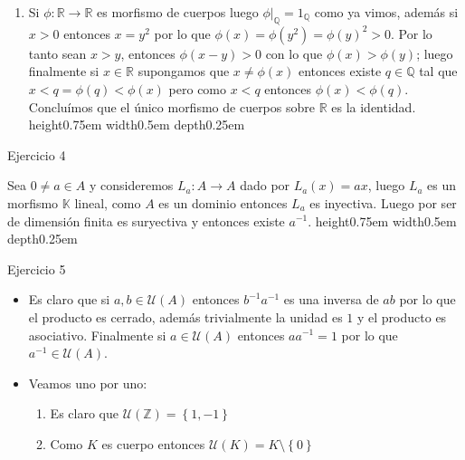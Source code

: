 \documentclass[11pt]{article}
\newcommand{\Q}{\mathbb{Q}}
\newcommand{\Z}{\mathbb{Z}}
\newcommand{\R}{{\mathbb{R}}}
\newcommand{\sett}[1]{\left\lbrace#1\right\rbrace}
\newenvironment{proof}[1][Demostraci\'on]{\begin{trivlist}
		\item[\hskip \labelsep {\bfseries #1}]}{\end{trivlist}}
\newcommand{\qed}{\nobreak \ifvmode \relax \else
	\ifdim\lastskip<1.5em \hskip-\lastskip
	\hskip1.5em plus0em minus0.5em \fi \nobreak
	\vrule height0.75em width0.5em depth0.25em\fi}
\begin{document}
\begin{enumerate}
\begin{proof}
\begin{enumerate}
			\item Si $\phi: \R \rightarrow \R$ es morfismo de cuerpos luego $\phi|_{\Q} = 1_{\Q}$ como ya vimos, adem\'as si $x > 0$ entonces $x = y^2$ por lo que $\phi(x) = \phi(y^2)=\phi(y)^2 > 0$. Por lo tanto sean $x > y$, entonces $\phi(x-y) > 0$ con lo que $\phi(x) > \phi(y)$; luego finalmente si $x \in \R$ supongamos que $x \neq \phi(x)$ entonces existe $q \in \Q$ tal que $x < q=\phi(q) < \phi(x)$ pero como $x < q$ entonces $\phi(x) < \phi(q)$. Conclu\'imos que el \'unico morfismo de cuerpos sobre $\R$ es la identidad. \qed
			
		\end{enumerate}
		
	\end{proof}
	
	\item Ejercicio 4
	
	\label{Ejercicio 4}
	
	\begin{proof}
		Sea $0 \neq a \in A$ y consideremos $L_a : A \rightarrow A$ dado por $L_a(x) = ax$, luego $L_a$ es un morfismo $\mathbb{K}$ lineal, como $A$ es un dominio  entonces $L_a$ es inyectiva. Luego por ser de dimensi\'on finita es suryectiva y entonces existe $a^{-1}$. \qed
	\end{proof}

	
	\item Ejercicio 5
	
	\label{Ejercicio 5}
	
	\begin{proof}
		
		\begin{itemize}
			
			\item Es claro que si $a,b \in \mathcal{U}(A)$ entonces $b^{-1}a^{-1}$ es una inversa de $ab$ por lo que el producto es cerrado, adem\'as trivialmente la unidad es $1$ y el producto es asociativo. Finalmente si $a \in \mathcal{U}(A) $ entonces $aa^{-1}=1$ por lo que $a^{-1} \in \mathcal{U}(A)$.
			
			\item Veamos uno por uno:
			
			\begin{enumerate}
				\item Es claro que $\mathcal{U}(\Z) = \sett{1,-1}$
				
				\item Como $K$ es cuerpo entonces $\mathcal{U}(K) = K \setminus \sett{0} $
				

\end{enumerate}
\end{itemize}
\end{proof}
\end{enumerate}
\end{document}
